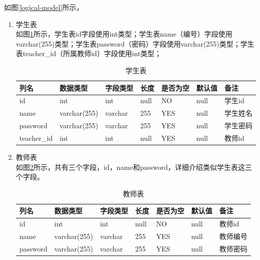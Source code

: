 如图\ref{logical-model}所示，
\begin{enumerate}
    \item 学生表\\
          如图\ref{db-student}所示，学生表id字段使用int类型；学生表name（编号）字段使用varchar(255)类型；学生表password（密码）字段使用varchar(255)类型；学生表teacher\_id（所属教师id）字段使用int类型；
          \begin{table}[]
              \centering
              \song\wuhao
              \caption{学生表}
              \label{db-student}
              \begin{tabular}{|l|l|l|l|l|l|l|}
                  \hline
                  列名        & 数据类型     & 字段类型 & 长度 & 是否为空 & 默认值 & 备注     \\ \hline
                  id          & int          & int      & null & NO       & null   & 学生id   \\ \hline
                  name        & varchar(255) & varchar  & 255  & YES      & null   & 学生姓名 \\ \hline
                  password    & varchar(255) & varchar  & 255  & YES      & null   & 学生密码 \\ \hline
                  teacher\_id & int          & int      & null & YES      & null   & 教师id   \\ \hline
              \end{tabular}
          \end{table}
    \item 教师表\\
          如图\ref{db-teacher}所示，共有三个字段，id，name和password，详细介绍类似学生表这三个字段。
          \begin{table}[H]
              \centering
              \song\wuhao
              \caption{教师表}
              \label{db-teacher}
              \begin{tabular}{|l|l|l|l|l|l|l|}
                  \hline
                  列名     & 数据类型     & 字段类型 & 长度 & 是否为空 & 默认值 & 备注     \\ \hline
                  id       & int          & int      & null & NO       & null   & 教师id   \\ \hline
                  name     & varchar(255) & varchar  & 255  & YES      & null   & 教师编号 \\ \hline
                  password & varchar(255) & varchar  & 255  & YES      & null   & 教师密码 \\ \hline
              \end{tabular}

\end{table}
\end{enumerate}
